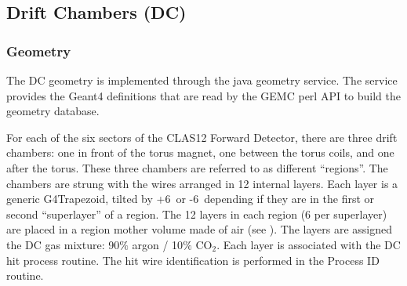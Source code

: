 \subsection{Drift Chambers (DC)}

\subsubsection{Geometry}

The DC geometry is implemented through the java geometry service.
The service provides the Geant4 definitions that are read by the GEMC perl API to build the geometry database.

For each of the six sectors of the CLAS12 Forward Detector, there are three drift chambers: one in front of the torus magnet,
one between the torus coils, and one after the torus.  These three chambers are referred to as different ``regions''.
The chambers are strung with the wires arranged in 12 internal layers.
Each layer is a generic G4Trapezoid, tilted by +6\mdeg \ or -6\mdeg \ depending if they are in the first or second
``superlayer'' of a region.
The 12 layers in each region (6 per superlayer) are placed in a region mother volume made of air (see ).
The layers are assigned the DC gas mixture: 90$\%$ argon / 10$\%$ CO$_2$. Each layer is associated with the DC hit process routine.
The hit wire identification is performed in the Process ID routine.

